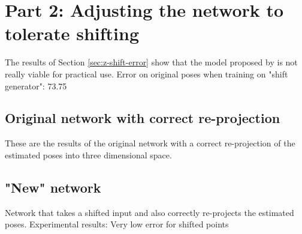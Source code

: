 \section{Part 2: Adjusting the network to tolerate shifting}
\label{sec:network-adjusting}

The results of Section \ref{sec:z-shift-error} show that the model proposed by \citet{drover18} is not really viable for practical use.
Error on original poses when training on "shift generator": 73.75
\subsection{Original network with correct re-projection}
These are the results of the original network with a correct re-projection of the estimated poses into three dimensional space.


\subsection{"New" network}
Network that takes a shifted input and also correctly re-projects the estimated poses.
Experimental results: Very low error for shifted points